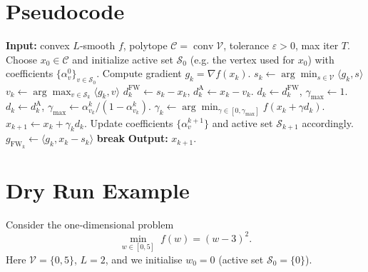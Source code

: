 \documentclass{article}
\newcommand{\gap}{g_{\text{FW}}}
\begin{document}
\section*{Pseudocode}
\begin{algorithm}[H]
\caption{Away‑Step Frank–Wolfe (AFW)}
\begin{algorithmic}[1]
\STATE \textbf{Input:} convex $L$‑smooth $f$, polytope $\mathcal{C}=\operatorname{conv}\mathcal{V}$,
tolerance $\varepsilon>0$, max iter $T$.
\STATE Choose $x_0\in\mathcal{C}$ and initialize active set $\mathcal{S}_0$ (e.g. the vertex used for $x_0$) with coefficients $\{\alpha_v^0\}_{v\in\mathcal{S}_0}$.
    \STATE Compute gradient $g_k=\nabla f(x_k)$.
    \STATE $s_k\gets\arg\min_{s\in\mathcal{V}}\langle g_k,s\rangle$ \hfill{}
    \STATE $v_k\gets\arg\max_{v\in\mathcal{S}_k}\langle g_k,v\rangle$ \hfill{}
    \STATE $d_k^{\text{FW}}\gets s_k-x_k$, $d_k^{\text{A}}\gets x_k-v_k$.
        \STATE $d_k\gets d_k^{\text{FW}}$, $\gamma_{\max}\gets 1$.
    \ELSE
        \STATE $d_k\gets d_k^{\text{A}}$, $\gamma_{\max}\gets \alpha_{v_k}^k/(1-\alpha_{v_k}^k)$.
    \ENDIF
    \STATE $\displaystyle\gamma_k\gets\arg\min_{\gamma\in[0,\gamma_{\max}]}f(x_k+\gamma d_k)$.
    \STATE $x_{k+1}\gets x_k+\gamma_k d_k$.
    \STATE Update coefficients $\{\alpha_v^{k+1}\}$ and active set $\mathcal{S}_{k+1}$ accordingly.
    \STATE $\gap_k\gets\langle g_k,x_k-s_k\rangle$ \hfill{}
    \IF{$\gap_k\le\varepsilon$}
        \STATE \textbf{break}
    \ENDIF
\ENDFOR
\STATE \textbf{Output:} $x_{k+1}$.
\end{algorithmic}
\end{algorithm}

\section*{Dry Run Example}
Consider the one‑dimensional problem
\[
\min_{w\in[0,5]}\;f(w)=(w-3)^2 .
\]
Here $\mathcal{V}=\{0,5\}$, $L=2$, and we initialise $w_0=0$ (active set $\mathcal{S}_0=\{0\}$).
\end{document}
